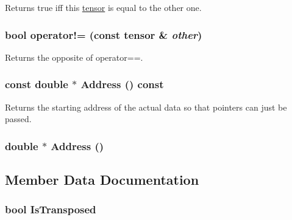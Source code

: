 Returns true iff this \hyperlink{classJKBuilder_1_1tensor}{tensor} is equal to the other one. \hypertarget{classJKBuilder_1_1tensor_a9b42dd835ddf2eb1a26b5d525b59b2b8}{
\subsubsection[{operator!=}]{\setlength{\rightskip}{0pt plus 5cm}bool operator!= (const {\bf tensor} \& {\em other})}}
\label{classJKBuilder_1_1tensor_a9b42dd835ddf2eb1a26b5d525b59b2b8}


Returns the opposite of operator==. \hypertarget{classJKBuilder_1_1tensor_a6a4e024f566d3bf9ba32a349afc5bbcf}{
\subsubsection[{Address}]{\setlength{\rightskip}{0pt plus 5cm}const double $\ast$ Address () const}}
\label{classJKBuilder_1_1tensor_a6a4e024f566d3bf9ba32a349afc5bbcf}


Returns the starting address of the actual data so that pointers can just be passed. \hypertarget{classJKBuilder_1_1tensor_ac982d9eb84092bfc13694448dd824cbc}{
\subsubsection[{Address}]{\setlength{\rightskip}{0pt plus 5cm}double $\ast$ Address ()}}
\label{classJKBuilder_1_1tensor_ac982d9eb84092bfc13694448dd824cbc}


\subsection{Member Data Documentation}
\hypertarget{classJKBuilder_1_1matrix_a77fa48e57c519482de2ec7ec182b16ef}{
\subsubsection[{IsTransposed}]{\setlength{\rightskip}{0pt plus 5cm}bool {\bf IsTransposed}}}
\label{classJKBuilder_1_1matrix_a77fa48e57c519482de2ec7ec182b16ef}


